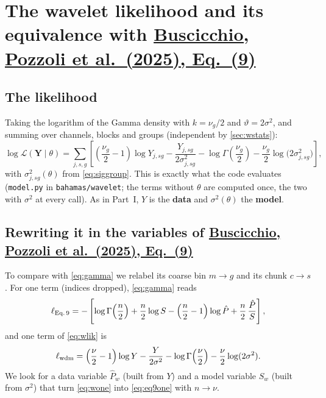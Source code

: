 \documentclass[11pt,a4paper]{article}
\newcommand{\urlPone}{https://arxiv.org/pdf/2511.03604}
\newcommand{\PoneEq}[1]{\href{\urlPone}{Buscicchio, Pozzoli et al.~(2025), Eq.~(#1)}}
\newcommand{\Pbar}{\hat{P}}
\begin{document}
\section[The wavelet likelihood and its equivalence with Eq.~(9)]{The wavelet likelihood and its equivalence with \PoneEq{9}}\label{sec:wmatch}

\subsection{The likelihood}

Taking the logarithm of the Gamma density with $k=\nu_g/2$ and $\vartheta=2\sigma^2$,
and summing over channels, blocks and groups (independent by \cref{sec:wstats}):
\begin{equation}
  \log\mathcal L(\boldsymbol Y\mid\theta) = \sum_{j,s,g}\left[
  \left(\frac{\nu_g}{2}-1\right)\log Y_{j,sg} - \frac{Y_{j,sg}}{2\sigma^2_{j,sg}}
  - \log\Gamma\!\left(\frac{\nu_g}{2}\right) - \frac{\nu_g}{2}\log\big(2\sigma^2_{j,sg}\big)\right],
  \label{eq:wlik}
\end{equation}
with $\sigma^2_{j,sg}(\theta)$ from \cref{eq:siggroup}. This is exactly what the code
evaluates (\texttt{model.py} in \texttt{bahamas/wavelet}; the terms without $\theta$ are computed
once, the two with $\sigma^2$ at every call). As in Part~I, $Y$ is the \textbf{data}
and $\sigma^2(\theta)$ the \textbf{model}.

\subsection[Rewriting it in the variables of Eq.~(9)]{Rewriting it in the variables of \PoneEq{9}}

To compare with \cref{eq:gamma} we relabel its coarse bin $m\to g$ and its chunk
$c\to s$. For one term (indices dropped), \cref{eq:gamma} reads
\begin{equation}
  \ell_{\rm Eq.\,9} = -\left[\log\Gamma\!\left(\frac{n}{2}\right) + \frac n2\log S
  - \left(\frac n2-1\right)\log\Pbar + \frac n2\,\frac{\Pbar}{S}\right],
  \label{eq:eq9one}
\end{equation}
and one term of \cref{eq:wlik} is
\begin{equation}
  \ell_{\rm wdm} = \left(\frac{\nu}{2}-1\right)\log Y - \frac{Y}{2\sigma^2}
  - \log\Gamma\!\left(\frac{\nu}{2}\right) - \frac{\nu}{2}\log(2\sigma^2).
  \label{eq:wone}
\end{equation}
We look for a data variable $\Pbar_w$ (built from $Y$) and a model variable $S_w$
(built from $\sigma^2$) that turn \cref{eq:wone} into \cref{eq:eq9one} with
$n\to\nu$.
\end{document}
